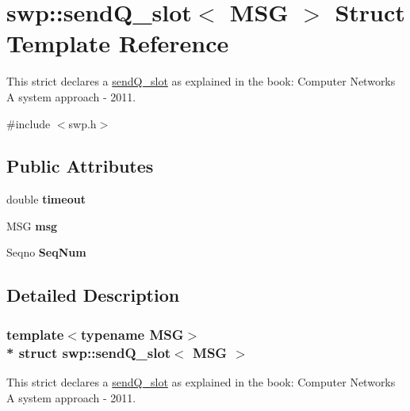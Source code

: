 \hypertarget{structswp_1_1sendQ__slot}{}\section{swp\+:\+:send\+Q\+\_\+slot$<$ M\+SG $>$ Struct Template Reference}
\label{structswp_1_1sendQ__slot}


This strict declares a \hyperlink{structswp_1_1sendQ__slot}{send\+Q\+\_\+slot} as explained in the book\+: Computer Networks A system approach -\/ 2011.  




{\ttfamily \#include $<$swp.\+h$>$}

\subsection*{Public Attributes}
\begin{DoxyCompactItemize}
\item 
double {\bfseries timeout}\hypertarget{structswp_1_1sendQ__slot_ac7f48feba5a37de64a0350e713009631}{}\label{structswp_1_1sendQ__slot_ac7f48feba5a37de64a0350e713009631}

\item 
M\+SG {\bfseries msg}\hypertarget{structswp_1_1sendQ__slot_aabf605e66a139fd95bc1fd7f608bb6ba}{}\label{structswp_1_1sendQ__slot_aabf605e66a139fd95bc1fd7f608bb6ba}

\item 
Seqno {\bfseries Seq\+Num}\hypertarget{structswp_1_1sendQ__slot_a88d9b195d48145a5722fe9034b9942df}{}\label{structswp_1_1sendQ__slot_a88d9b195d48145a5722fe9034b9942df}

\end{DoxyCompactItemize}


\subsection{Detailed Description}
\subsubsection*{template$<$typename M\+SG$>$\\*
struct swp\+::send\+Q\+\_\+slot$<$ M\+S\+G $>$}

This strict declares a \hyperlink{structswp_1_1sendQ__slot}{send\+Q\+\_\+slot} as explained in the book\+: Computer Networks A system approach -\/ 2011. 

